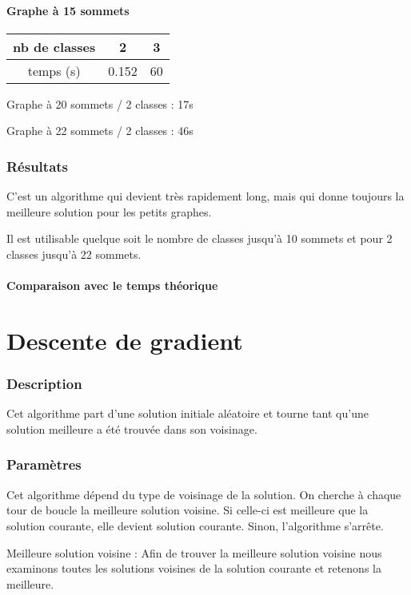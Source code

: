 \documentclass[12pt]{article}
\begin{document}
\subsection{Graphe à 15 sommets}

\begin{tabular}{|c|c|c |}
	\hline 
	nb de classes & 2 & 3 \\
	\hline
	temps (s) & 0.152 & 60 \\
	\hline
\end{tabular}

\bigskip
Graphe à 20 sommets / 2 classes : 17s

Graphe à 22 sommets / 2 classes : 46s

\section{Résultats}
C'est un algorithme qui devient très rapidement long, mais qui donne toujours la meilleure solution pour les petits graphes.

Il est utilisable quelque soit le nombre de classes jusqu’à 10 sommets et pour 2 classes jusqu’à 22 sommets.

\subsection{Comparaison avec le temps théorique}

\newpage

\part{Descente de gradient}
\section{Description}
Cet algorithme part d’une solution initiale aléatoire et tourne tant qu’une solution meilleure a été trouvée dans son voisinage.

\section{Paramètres}
Cet algorithme dépend du type de voisinage de la solution. On cherche à chaque tour de boucle la meilleure solution voisine. Si celle-ci est meilleure que la solution courante, elle devient solution courante. Sinon, l’algorithme s’arrête.

Meilleure solution voisine : Afin de trouver la meilleure solution voisine nous examinons toutes les solutions voisines de la solution courante et retenons la meilleure.
\end{document}

